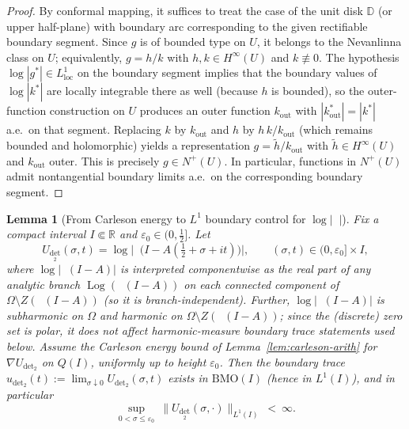 \documentclass[11pt]{amsart}
\newtheorem{lemma}[theorem]{Lemma}
\theoremstyle{definition}
\theoremstyle{remark}
\newcommand{\R}{\mathbb{R}}
\DeclareMathOperator{\dettwo}{det_2}
\newcommand{\editblue}[1]{{#1}}
\begin{document}
\begin{proof}
By conformal mapping, it suffices to treat the case of the unit disk $\mathbb D$ (or upper half-plane) with boundary arc corresponding to the given rectifiable boundary segment.
Since $g$ is of bounded type on $U$, it belongs to the Nevanlinna class on $U$; equivalently, $g=h/k$ with $h,k\in H^\infty(U)$ and $k\not\equiv 0$.
The hypothesis $\log|g^*|\in L^1_{\mathrm{loc}}$ on the boundary segment implies that the boundary values of $\log|k^*|$ are locally integrable there as well (because $h$ is bounded),
so the outer-function construction on $U$ produces an outer function $k_{\mathrm{out}}$ with $|k_{\mathrm{out}}^*|=|k^*|$ a.e.\ on that segment.
Replacing $k$ by $k_{\mathrm{out}}$ and $h$ by $h\,k/k_{\mathrm{out}}$ (which remains bounded and holomorphic) yields a representation $g=\tilde h/k_{\mathrm{out}}$ with
$\tilde h\in H^\infty(U)$ and $k_{\mathrm{out}}$ outer. This is precisely $g\in N^+(U)$.
In particular, functions in $N^+(U)$ admit nontangential boundary limits a.e.\ on the corresponding boundary segment.
\end{proof}
\begin{lemma}[From Carleson energy to $L^1$ boundary control for $\log|\dettwo|$]\label{lem:det2-logL1-from-carleson}
Fix a compact interval $I\Subset\R$ and $\varepsilon_0\in(0,\tfrac12]$. Let
\[
U_{\det_2}(\sigma,t)=\log\Big|\dettwo\!\Big(I-A(\tfrac12+\sigma+it)\Big)\Big|,\qquad (\sigma,t)\in(0,\varepsilon_0]\times I,
\]
\editblue{where $\log|\dettwo(I-A)|$ is interpreted componentwise as the real part of any analytic branch $\operatorname{Log}(\dettwo(I-A))$ on each connected component of $\Omega\setminus Z(\dettwo(I-A))$ (so it is branch-independent). Further, $\log|\dettwo(I-A)|$ is subharmonic on $\Omega$ and harmonic on $\Omega\setminus Z(\dettwo(I-A))$; since the (discrete) zero set is polar, it does not affect harmonic-measure boundary trace statements used below.}
Assume the Carleson energy bound of Lemma~\ref{lem:carleson-arith} for $\nabla U_{\det_2}$ on $Q(I)$, uniformly up to height $\varepsilon_0$.
Then the boundary trace $u_{\det_2}(t):=\lim_{\sigma\downarrow0}U_{\det_2}(\sigma,t)$ exists in $\mathrm{BMO}(I)$ (hence in $L^1(I)$), and in particular
\[
\sup_{0<\sigma\le \varepsilon_0}\ \|U_{\det_2}(\sigma,\cdot)\|_{L^1(I)}\ <\ \infty.
\]
\end{lemma}
\end{document}
